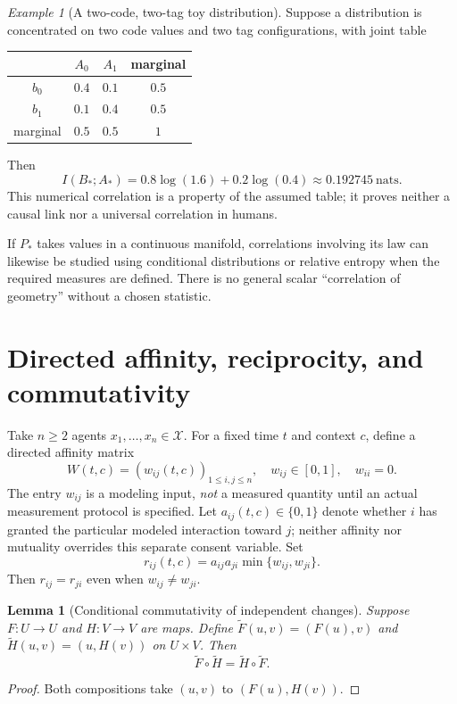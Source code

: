 \documentclass[11pt,a4paper]{article}
\numberwithin{equation}{section}
\newtheorem{lemma}[definition]{Lemma}
\theoremstyle{remark}
\newtheorem{example}[definition]{Example}
\newcommand{\X}{\mathcal{X}}
\newcommand{\1}{\mathbf{1}}
\begin{document}
\begin{example}[A two-code, two-tag toy distribution]
Suppose a distribution is concentrated on two code values and two tag
configurations, with joint table
\begin{center}
\begin{tabular}{c|cc|c}
 & $A_0$ & $A_1$ & marginal\\\hline
$b_0$ & $0.4$ & $0.1$ & $0.5$\\
$b_1$ & $0.1$ & $0.4$ & $0.5$\\\hline
marginal & $0.5$ & $0.5$ & $1$
\end{tabular}
\end{center}
Then
\begin{equation}
I(B_*;A_*)=0.8\log(1.6)+0.2\log(0.4)
\approx0.192745\ \text{nats}.
\end{equation}
This numerical correlation is a property of the assumed table; it
proves neither a causal link nor a universal correlation in humans.
\end{example}

If $P_*$ takes values in a continuous manifold, correlations involving
its law can likewise be studied using conditional distributions or
relative entropy when the required measures are defined.  There is no
general scalar ``correlation of geometry'' without a chosen statistic.

\section{Directed affinity, reciprocity, and commutativity}

Take $n\ge2$ agents $x_1,\ldots,x_n\in\X$.
For a fixed time $t$ and context $c$, define a directed affinity matrix
\begin{equation}\label{eq:W}
W(t,c)=(w_{ij}(t,c))_{1\le i,j\le n},\quad
w_{ij}\in[0,1],\quad w_{ii}=0.
\end{equation}
The entry $w_{ij}$ is a modeling input, \emph{not} a measured quantity
until an actual measurement protocol is specified.
Let $a_{ij}(t,c)\in\{0,1\}$ denote whether $i$ has granted the particular
modeled interaction toward $j$; neither affinity nor mutuality overrides
this separate consent variable.  Set
\begin{equation}\label{eq:reciprocal}
r_{ij}(t,c)=a_{ij}a_{ji}\min\{w_{ij},w_{ji}\}.
\end{equation}
Then $r_{ij}=r_{ji}$ even when $w_{ij}\ne w_{ji}$.

\begin{lemma}[Conditional commutativity of independent changes]
Suppose $F:U\to U$ and $H:V\to V$ are maps.  Define
$\widetilde F(u,v)=(F(u),v)$ and
$\widetilde H(u,v)=(u,H(v))$ on $U\times V$.
Then
\begin{equation}\label{eq:commuting}
\widetilde F\circ\widetilde H
=\widetilde H\circ\widetilde F.
\end{equation}
\end{lemma}
\begin{proof}
Both compositions take $(u,v)$ to $(F(u),H(v))$.
\end{proof}
\end{document}
